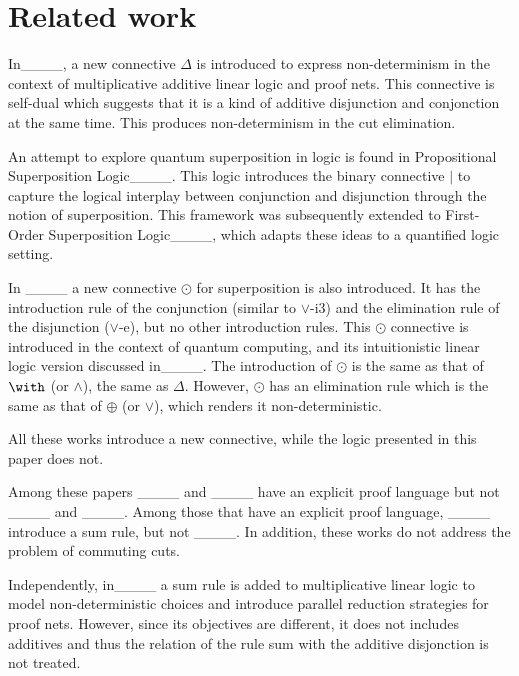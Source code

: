 \section{Related work}
In____, a new connective $\Delta$ is introduced to
express non-deter\-min\-ism in the context of multiplicative additive
linear logic and proof nets. This connective is self-dual which
suggests that it is a kind of additive disjunction and conjonction at
the same time. This produces non-determinism in the cut elimination.

An attempt to explore quantum superposition in logic is found in
Propositional Superposition Logic____. This logic
introduces the binary connective $|$ to capture the logical interplay
between conjunction and disjunction through the notion of
superposition. This framework was subsequently extended to First-Order
Superposition Logic____, which adapts these
ideas to a quantified logic setting.

In ____ a new connective $\odot$ for
superposition is also introduced. It has the introduction rule of the
conjunction (similar to $\vee$-i3) and the elimination rule of the
disjunction ($\vee$-e), but no other introduction rules.  This $\odot$
connective is introduced in the context of quantum computing, and its
intuitionistic linear logic version discussed
in____. The introduction of $\odot$ is the same
as that of $\with$ (or $\wedge$), the same as $\Delta$. However,
$\odot$ has an elimination rule which is the same as that of $\oplus$ (or $\vee$),
which renders it non-deterministic.

All these works introduce a new connective, while the logic presented
in this paper does not.

Among these papers ____ and ____
have an explicit proof language  but not ____ and
____.
Among those that have an explicit proof language, 
____ introduce a sum rule, but not
____.
In addition, these works do not address the problem of commuting cuts.

Independently, in____ a sum rule is added to multiplicative linear logic to model non-deterministic choices and introduce parallel reduction strategies for proof nets.  However, since its objectives are different, it does not includes additives and thus the relation of the rule sum with the additive disjonction is not treated.


